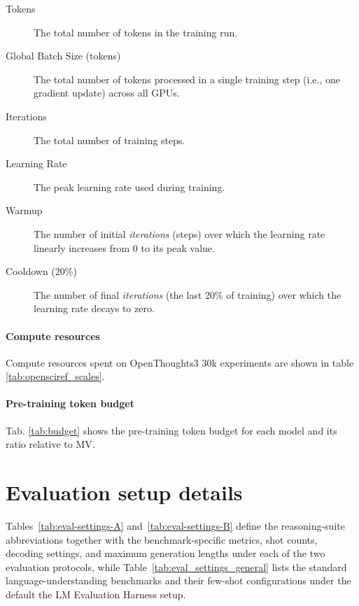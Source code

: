 \begin{description}
    \item[Tokens] The total number of tokens in the training run.
    \item[Global Batch Size (tokens)] The total number of tokens processed in a single training step (i.e., one gradient update) across all GPUs.
    \item[Iterations] The total number of training steps.
    \item[Learning Rate] The peak learning rate used during training.
    \item[Warmup] The number of initial \textit{iterations} (steps) over which the learning rate linearly increases from 0 to its peak value.
    \item[Cooldown (20\%)] The number of final \textit{iterations} (the last 20\% of training) over which the learning rate decays to zero.
\end{description}

\paragraph{Compute resources}

Compute resources spent on OpenThoughts3 30k experiments are shown in table \ref{tab:opensciref_scales}.

\paragraph{Pre-training token budget} Tab. \ref{tab:budget} shows the pre-training token budget for each model and its ratio relative to MV.

\section{Evaluation setup details}
Tables~\ref{tab:eval-settings-A} and~\ref{tab:eval-settings-B} define the reasoning-suite abbreviations together with the benchmark-specific metrics, shot counts, decoding settings, and maximum generation lengths under each of the two evaluation protocols, while Table~\ref{tab:eval_settings_general} lists the standard language-understanding benchmarks and their few-shot configurations under the default the LM Evaluation Harness setup.

\clearpage


